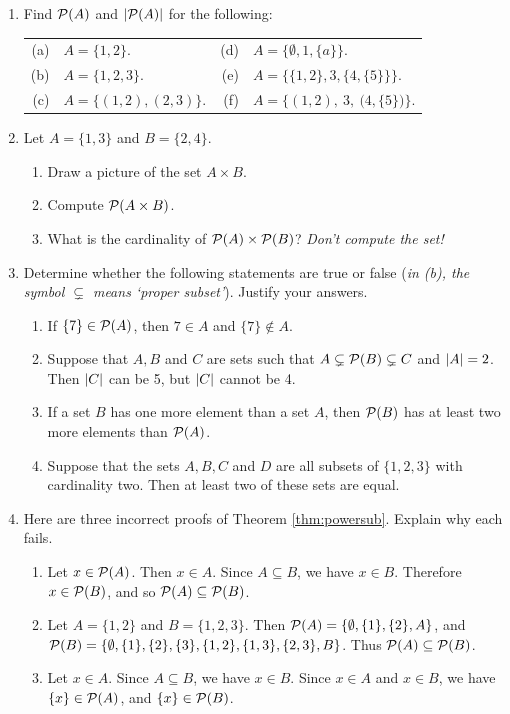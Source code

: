 \begin{exercises}{}{}

\begin{enumerate}
  \item Find $\mathcal{P}(A)$ and $\left| \mathcal{P}(A)\right|$ for the following:\\[5pt]
	\begin{tabular}{r@{\ \ }l@{\qquad\qquad\qquad\qquad}r@{\ \ }l}
	(a)&$A=\{1,2\}$.&(d)&$A=\{\emptyset,1,\{a\}\}$.\\[2pt]
	(b)&$A=\{1,2,3\}$.&(e)&$A=\Big\{\big\{1,2\big\},3,\big\{4,\{5\}\big\}\Big\}$.\\[5pt]
	(c)&$A=\bigl\{(1,2),(2,3)\bigr\}$.&(f)&$A=\Big\{(1,2),\ 3,\ \bigl(4,\{5\}\bigr)\Big\}$.
	\end{tabular}
	
	\item Let $A=\{1,3\}$ and $B=\{2,4\}$.
	\begin{enumerate}
	  \item Draw a picture of the set $A\times B$.
	  \item Compute $\mathcal{P}(A\times B)$.
	  \item What is the cardinality of $\mathcal{P}(A)\times\mathcal{P}(B)$? \emph{Don't compute the set!}
	\end{enumerate}
  
	\item Determine whether the following statements are true or false (\emph{in (b), the symbol $\subsetneq$ means `proper subset'}). Justify your answers.
  \begin{enumerate}
    \item If $\{7\}\in\mathcal{P}(A)$, then $7\in A$ and $\{7\}\notin A$.
    \item Suppose that $A,B$ and $C$ are sets such that $A\subsetneq\mathcal{P}(B)\subsetneq C$ and $\left| A\right|=2$. Then $\left| C\right|$ can be 5, but $\left| C\right|$ cannot be 4.
    \item If a set $B$ has one more element than a set $A$, then $\mathcal{P}(B)$ has at least two more elements than $\mathcal{P}(A)$.
    \item Suppose that the sets $A,B,C$ and $D$ are all subsets of $\{1,2,3\}$ with cardinality two. Then at least two of these sets are equal. 
  \end{enumerate}
  
	\item\label{ex:powersub1} Here are three incorrect proofs of Theorem \ref{thm:powersub}. Explain why each fails.
	\begin{enumerate}
		\item Let $x\in\mathcal{P}(A)$. Then $x\in A$. Since $A\subseteq B$, we have $x\in B$. Therefore $x\in\mathcal{P}(B)$, and so $\mathcal{P}(A)\subseteq\mathcal{P}(B)$.
		\item Let $A=\{1,2\}$ and $B=\{1,2,3\}$. Then $\mathcal{P}(A)=\{\emptyset,\{1\},\{2\},A\}$, and\\
		$\mathcal{P}(B)=\{\emptyset,\{1\},\{2\},\{3\},\{1,2\},\{1,3\},\{2,3\},B\}$. Thus $\mathcal{P}(A)\subseteq\mathcal{P}(B)$.
		\item Let $x\in A$. Since $A\subseteq B$, we have $x\in B$. Since $x\in A$ and $x\in B$, we have $\{x\}\in\mathcal{P}(A)$, and $\{x\}\in\mathcal{P}(B)$.
	\end{enumerate}
	

\end{enumerate}
\end{exercises}
